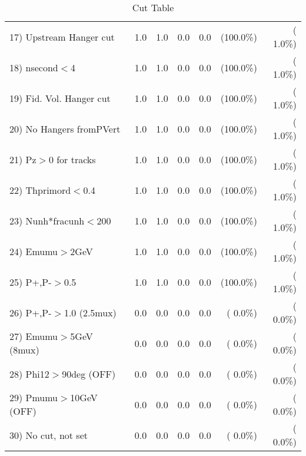 \begin{table}[h!]
\begin{tabular}{||l||r|r|r|r|r|r||}
 17) Upstream Hanger cut  &          1.0 &          1.0 &          0.0 &          0.0 & (100.0\%) & (  1.0\%) \\
 18) nsecond$<$4          &          1.0 &          1.0 &          0.0 &          0.0 & (100.0\%) & (  1.0\%) \\
 19) Fid. Vol. Hanger cut &          1.0 &          1.0 &          0.0 &          0.0 & (100.0\%) & (  1.0\%) \\
 20) No Hangers fromPVert &          1.0 &          1.0 &          0.0 &          0.0 & (100.0\%) & (  1.0\%) \\
 21) Pz$>$0 for tracks    &          1.0 &          1.0 &          0.0 &          0.0 & (100.0\%) & (  1.0\%) \\
 22) Thprimord$<$0.4      &          1.0 &          1.0 &          0.0 &          0.0 & (100.0\%) & (  1.0\%) \\
 23) Nunh*fracunh$<$200   &          1.0 &          1.0 &          0.0 &          0.0 & (100.0\%) & (  1.0\%) \\
 24) Emumu$>$2GeV         &          1.0 &          1.0 &          0.0 &          0.0 & (100.0\%) & (  1.0\%) \\
 25) P+,P-$>$0.5          &          1.0 &          1.0 &          0.0 &          0.0 & (100.0\%) & (  1.0\%) \\
 26) P+,P-$>$1.0 (2.5mux) &          0.0 &          0.0 &          0.0 &          0.0 & (  0.0\%) & (  0.0\%) \\
 27) Emumu$>$5GeV  (8mux) &          0.0 &          0.0 &          0.0 &          0.0 & (  0.0\%) & (  0.0\%) \\
 28) Phi12$>$90deg  (OFF) &          0.0 &          0.0 &          0.0 &          0.0 & (  0.0\%) & (  0.0\%) \\
 29) Pmumu$>$10GeV  (OFF) &          0.0 &          0.0 &          0.0 &          0.0 & (  0.0\%) & (  0.0\%) \\
 30) No cut, not set      &          0.0 &          0.0 &          0.0 &          0.0 & (  0.0\%) & (  0.0\%) \\
 \hline
 \hline
 \end{tabular}
 \caption{Cut Table           }
 \label{tab-cutheavy_neutrino_0.350}
 \end{table}
